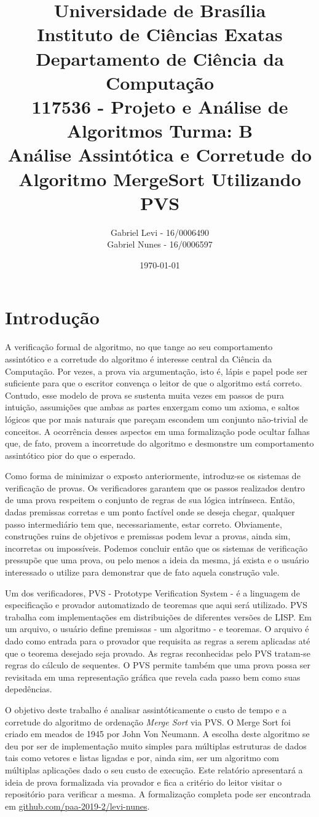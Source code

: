 \documentclass[12pt]{article}
\title{{\large Universidade de Brasília \\ Instituto de Ciências Exatas \\
Departamento de Ciência da Computação} \\[1cm]
117536 - Projeto e Análise de Algoritmos Turma: B\\[.5cm]
Análise Assintótica e Corretude do Algoritmo MergeSort Utilizando PVS}
\author{Gabriel Levi - 16/0006490 \\
        Gabriel Nunes - 16/0006597}
\date{\today}
\theoremstyle{definition}
\begin{document}
\maketitle
\newpage

\section{Introdução}
\noindent A verificação formal de algoritmo, no que tange ao seu comportamento assintótico e a corretude do algoritmo é interesse
central da Ciência da Computação. Por vezes, a prova via argumentação, isto é, lápis e papel pode ser suficiente para que o escritor
convença o leitor de que o algoritmo está correto. Contudo, esse modelo de prova se sustenta muita vezes em passos de pura intuição,
assumições que ambas as partes enxergam como um axioma, e saltos lógicos que por mais naturais que pareçam escondem um conjunto não-trivial
de conceitos. A ocorrência desses aspectos em uma formalização pode ocultar falhas que, de fato, provem a incorretude do algoritmo e desmonstre
um comportamento assintótico pior do que o esperado.

Como forma de minimizar o exposto anteriormente, introduz-se os sistemas de verificação de provas. Os verificadores garantem que os passos realizados
dentro de uma prova respeitem o conjunto de regras de sua lógica intrínseca. Então, dadas premissas corretas e um ponto factível onde se deseja chegar, qualquer
passo intermediário tem que, necessariamente, estar correto. Obviamente, construções ruins de objetivos e premissas podem levar a provas, ainda sim, incorretas
ou impossíveis. Podemos concluir então que os sistemas de verificação pressupõe que uma prova, ou pelo menos a ideia da mesma, já exista e o usuário interessado
o utilize para demonstrar que de fato aquela construção vale.

Um dos verificadores, PVS - Prototype Verification System - é a linguagem de especificação e provador automatizado de teoremas que aqui será utilizado.
PVS trabalha com implementações em distribuições de diferentes versões de LISP. Em um arquivo, o usuário define premissas - um algoritmo - e teoremas.
O arquivo é dado como entrada para o provador que requisita as regras a serem aplicadas até que o teorema desejado seja provado. As regras reconhecidas pelo
PVS tratam-se regras do cálculo de sequentes. O PVS permite também que uma prova possa ser revisitada em uma representação gráfica que
revela cada passo bem como suas depedências.

O objetivo deste trabalho é analisar assintóticamente o custo de tempo e a corretude do algoritmo de ordenação \textit{Merge Sort} via PVS. O Merge Sort foi criado
em meados de 1945 por John Von Neumann. A escolha deste algoritmo se deu por ser de implementação muito simples para múltiplas estruturas de dados tais como
vetores e listas ligadas e por, ainda sim, ser um algoritmo com múltiplas aplicações dado o seu custo de execução. Este relatório apresentará a ideia de prova
formalizada via provador e fica a critério do leitor visitar o repositório para verificar a mesma. A formalização completa pode ser encontrada em \url{github.com/paa-2019-2/levi-nunes}.
\end{document}
